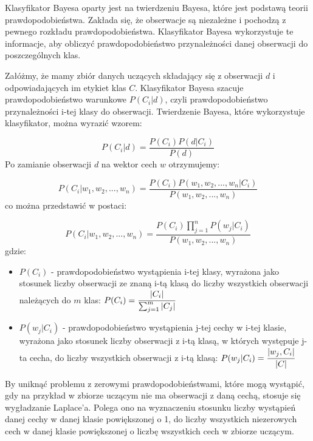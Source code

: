 \documentclass{article}
\begin{document}
Klasyfikator Bayesa oparty jest na twierdzeniu Bayesa, 
które jest podstawą teorii prawdopodobieństwa. Zakłada 
się, że obserwacje są niezależne i pochodzą z pewnego 
rozkładu prawdopodobieństwa. Klasyfikator Bayesa 
wykorzystuje te informacje, aby obliczyć prawdopodobieństwo 
przynależności danej obserwacji do poszczególnych klas.

Załóżmy, że mamy zbiór danych uczących składający się z 
obserwacji $d$ i odpowiadających im etykiet klas $C$. 
Klasyfikator Bayesa szacuje prawdopodobieństwo warunkowe 
$P(C_i|d)$, czyli prawdopodobieństwo przynależności i-tej
klasy do obserwacji. 
Twierdzenie Bayesa, które wykorzystuje klasyfikator,
można wyrazić wzorem:

\begin{equation}
    P(C_i|d) = \frac{P(C_i)P(d|C_i)}{P(d)}
\end{equation}
Po zamianie obserwacji $d$ na wektor cech $w$ otrzymujemy:

\begin{equation}
    P(C_i|w_1, w_2, ..., w_n) = \frac{P(C_i)P(w_1, w_2, ..., w_n|C_i)}{P(w_1, w_2, ..., w_n)}
\end{equation}
co można przedstawić w postaci:

\begin{equation}
    P(C_i|w_1, w_2, ..., w_n) = \frac{P(C_i)\prod_{j=1}^{n}P(w_j|C_i)}{P(w_1, w_2, ..., w_n)}
\end{equation}
gdzie:
\begin{itemize}
    \item $P(C_i)$ - prawdopodobieństwo wystąpienia i-tej klasy, wyrażona jako 
    stosunek liczby obserwacji ze znaną i-tą klasą do liczby wszystkich obserwacji
    należących do $m$ klas:
    $P(C_i) = \cfrac{|C_i|}{\sum_{j=1}^{m}|C_j|}$
    \item $P(w_j|C_i)$ - prawdopodobieństwo wystąpienia j-tej cechy w i-tej klasie,
    wyrażona jako stosunek liczby obserwacji z i-tą klasą, w których występuje j-ta cecha,
    do liczby wszystkich obserwacji z i-tą klasą:
    $P(w_j|C_i) = \cfrac{|w_j, C_i|}{|C|}$
\end{itemize}

By uniknąć problemu z zerowymi prawdopodobieństwami,
które mogą wystąpić, gdy na przykład w zbiorze uczącym nie ma obserwacji
z daną cechą, stosuje się wygładzanie Laplace'a. Polega ono
na wyznaczeniu stosunku liczby wystąpień danej cechy w danej klasie
powiększonej o 1, do liczby wszystkich niezerowych cech w danej klasie powiększonej
o liczbę wszystkich cech w zbiorze uczącym.
\end{document}
